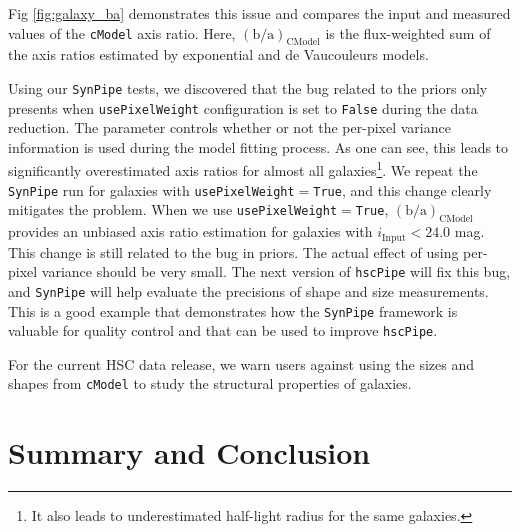 \documentclass[useamsfonts]{pasj01}
\def\hscpipe{\texttt{hscPipe}}
\def\synpipe{\texttt{SynPipe}}
\def\cmodel{\texttt{cModel}}
\begin{document}
    Fig \ref{fig:galaxy_ba} demonstrates this issue and compares the input and 
    measured values of the \cmodel{} axis ratio. 
    Here, $({\mathrm{b}/\mathrm{a}})_{\mathrm{CModel}}$ is the flux-weighted sum of the
    axis ratios estimated by exponential and de Vaucouleurs models.    
    
    Using our \synpipe{} tests, we discovered that the bug related to the priors only 
    presents when \texttt{usePixelWeight} configuration is set to \texttt{False} during 
    the data reduction. 
    The parameter controls whether or not the per-pixel variance information is used 
    during the model fitting process.  
    As one can see, this leads to significantly overestimated axis ratios for almost
    all galaxies\footnote{It also leads to underestimated half-light radius for the same
    galaxies.}.
    We repeat the \synpipe{} run for galaxies with 
    \texttt{usePixelWeight}$=$\texttt{True}, and this change clearly mitigates
    the problem. 
    When we use \texttt{usePixelWeight}$=$\texttt{True},
    $({\mathrm{b}/\mathrm{a}})_{\mathrm{CModel}}$ provides an unbiased axis ratio 
    estimation for galaxies with $i_{\mathrm{Input}}< 24.0$ mag.
    This change is still related to the bug in priors.  
    The actual effect of using per-pixel variance should be very small.  
    The next version of \hscpipe{} will fix this bug, and \synpipe{} will help evaluate 
    the precisions of shape and size measurements. 
    This is a good example that demonstrates how the \synpipe{} framework is valuable  
    for quality control and that can be used to improve \hscpipe{}.

    For the current HSC data release, we warn users against using the sizes and shapes 
    from \cmodel{} to study the structural properties of galaxies.


\section{Summary and Conclusion}
    \label{sec:summary}
\end{document}
